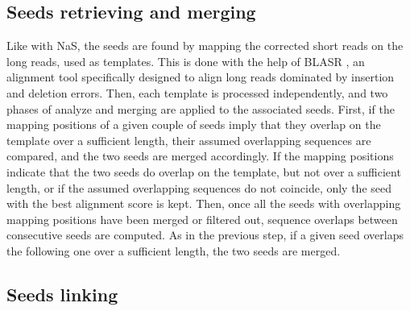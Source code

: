 \documentclass[long, final]{jobim2017}
\begin{document}
\subsection{Seeds retrieving and merging}

Like with NaS, the seeds are found by mapping the corrected short reads on the long reads, used as templates. This is done with the help of BLASR \cite{Chaisson2012}, an alignment tool specifically designed to align long reads dominated by insertion and deletion errors. Then, each template is processed independently, and two phases of analyze and merging are applied to the associated seeds. First, if the mapping positions of a given couple of seeds imply that they overlap on the template over a sufficient length, their assumed overlapping sequences are compared, and the two seeds are merged accordingly. If the mapping positions indicate that the two seeds do overlap on the template, but not over a sufficient length, or if the assumed overlapping sequences do not coincide, only the seed with the best alignment score is kept. Then, once all the seeds with overlapping mapping positions have been merged or filtered out, sequence overlaps between consecutive seeds are computed. As in the previous step, if a given seed overlaps the following one over a sufficient length, the two seeds are merged.

\subsection{Seeds linking}
\end{document}
